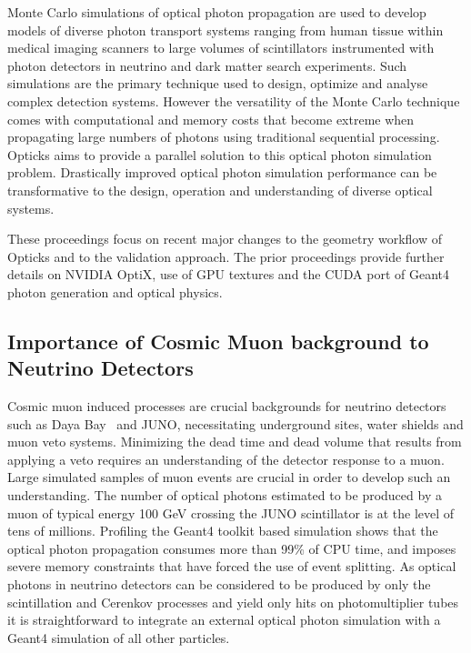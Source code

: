 \documentclass{webofc}
\begin{document}
Monte Carlo simulations of optical photon propagation 
are used to develop models of diverse photon transport systems 
ranging from human tissue within medical imaging scanners 
to large volumes of scintillators instrumented with photon detectors in neutrino 
and dark matter search experiments. 
Such simulations are the primary technique used to design, optimize 
and analyse complex detection systems. However the versatility 
of the Monte Carlo technique comes with computational and memory costs 
that become extreme when propagating large numbers of photons
using traditional sequential processing. Opticks aims to provide a 
parallel solution to this optical photon simulation problem.  Drastically 
improved optical photon simulation performance can be transformative 
to the design, operation and understanding of diverse optical systems.

These proceedings focus on recent major changes to the geometry workflow of Opticks 
and to the validation approach. The prior proceedings\cite{chep2016} provide further
details on NVIDIA OptiX, use of GPU textures and the CUDA port of Geant4 photon generation 
and optical physics.
%
\subsection{Importance of Cosmic Muon background to Neutrino Detectors}
%
Cosmic muon induced processes are crucial backgrounds for neutrino
detectors such as Daya Bay~\cite{dyb} and JUNO\cite{juno},
necessitating underground sites, water shields and muon veto systems.
Minimizing the dead time and dead volume that results from applying
a veto requires an understanding of the detector response to a muon.
Large simulated samples of muon events are crucial in order to
develop such an understanding.
%
The number of optical photons estimated to be produced by a muon of
typical energy 100 GeV crossing the JUNO scintillator is at the level of tens of millions.
Profiling the Geant4 toolkit based simulation shows that the optical photon propagation 
consumes more than 99\% of CPU time, and imposes severe memory constraints that have forced
the use of event splitting.  
%
As optical photons in neutrino detectors can be considered to be produced
by only the scintillation and Cerenkov processes and yield only hits
on photomultiplier tubes it is straightforward to integrate an
external optical photon simulation with a Geant4 simulation of all other particles.
%
\end{document}

